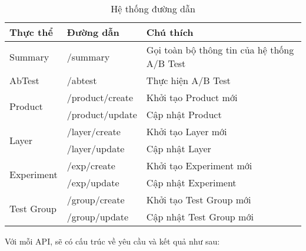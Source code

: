 \begin{table}[H]
	\centering
	\begin{tabular}{|l|l|l|}
		\hline
		\textbf{Thực thể}           & \textbf{Đường dẫn} & \textbf{Chú thích}                          \\ \hline
		Summary                     & /summary           & Gọi toàn bộ thông tin của hệ thống A/B Test \\ \hline
		AbTest                      & /abtest            & Thực hiện A/B Test                          \\ \hline
		\multirow{2}{*}{Product}    & /product/create    & Khởi tạo Product mới                        \\ \cline{2-3}
		                            & /product/update    & Cập nhật Product                            \\ \hline
		\multirow{2}{*}{Layer}      & /layer/create      & Khởi tạo Layer mới                          \\ \cline{2-3}
		                            & /layer/update      & Cập nhật Layer                              \\ \hline
		\multirow{2}{*}{Experiment} & /exp/create        & Khởi tạo Experiment mới                     \\ \cline{2-3}
		                            & /exp/update        & Cập nhật Experiment                         \\ \hline
		\multirow{2}{*}{Test Group} & /group/create      & Khởi tạo Test Group mới                     \\ \cline{2-3}
		                            & /group/update      & Cập nhật Test Group mới                     \\ \hline
	\end{tabular}
	\caption{Hệ thống đường dẫn}
\end{table}

Với mỗi API, sẽ có cấu trúc về yêu cầu và kết quả như sau:

